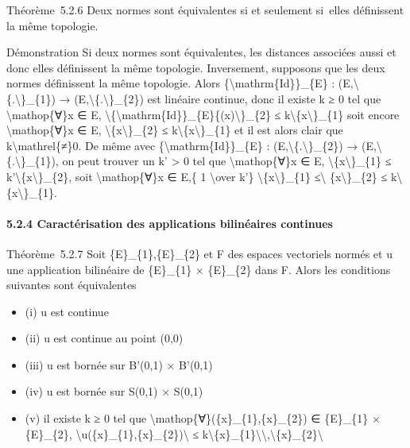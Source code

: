 \documentclass[]{article}
\begin{document}
Théorème~5.2.6 Deux normes sont équivalentes si et seulement si~elles
définissent la même topologie.

Démonstration Si deux normes sont équivalentes, les distances associées
aussi et donc elles définissent la même topologie. Inversement,
supposons que les deux normes définissent la même topologie. Alors
\{\textbackslash{}mathrm\{Id\}\}\_\{E\} :
(E,\textbackslash{}\textbar{}\{.\textbackslash{}\textbar{}\}\_\{1\}) →
(E,\textbackslash{}\textbar{}\{.\textbackslash{}\textbar{}\}\_\{2\}) est
linéaire continue, donc il existe k ≥ 0 tel que
\textbackslash{}mathop\{∀\}x ∈ E,
\textbackslash{}\textbar{}\{\textbackslash{}mathrm\{Id\}\}\_\{E\}\{(x)\textbackslash{}\textbar{}\}\_\{2\}
≤ k\textbackslash{}\textbar{}\{x\textbackslash{}\textbar{}\}\_\{1\} soit
encore \textbackslash{}mathop\{∀\}x ∈ E,
\textbackslash{}\textbar{}\{x\textbackslash{}\textbar{}\}\_\{2\} ≤
k\textbackslash{}\textbar{}\{x\textbackslash{}\textbar{}\}\_\{1\} et il
est alors clair que k\textbackslash{}mathrel\{≠\}0. De même avec
\{\textbackslash{}mathrm\{Id\}\}\_\{E\} :
(E,\textbackslash{}\textbar{}\{.\textbackslash{}\textbar{}\}\_\{2\}) →
(E,\textbackslash{}\textbar{}\{.\textbackslash{}\textbar{}\}\_\{1\}), on
peut trouver un k' \textgreater{} 0 tel que \textbackslash{}mathop\{∀\}x
∈ E, \textbackslash{}\textbar{}\{x\textbackslash{}\textbar{}\}\_\{1\} ≤
k'\textbackslash{}\textbar{}\{x\textbackslash{}\textbar{}\}\_\{2\}, soit
\textbackslash{}mathop\{∀\}x ∈ E,\{ 1 \textbackslash{}over k'\}
\textbackslash{}\textbar{}\{x\textbackslash{}\textbar{}\}\_\{1\}
≤\textbackslash{}\textbar{} \{x\textbackslash{}\textbar{}\}\_\{2\} ≤
k\textbackslash{}\textbar{}\{x\textbackslash{}\textbar{}\}\_\{1\}.

\paragraph{5.2.4 Caractérisation des applications bilinéaires continues}

Théorème~5.2.7 Soit \{E\}\_\{1\},\{E\}\_\{2\} et F des espaces
vectoriels normés et u une application bilinéaire de \{E\}\_\{1\} ×
\{E\}\_\{2\} dans F. Alors les conditions suivantes sont équivalentes

\begin{itemize}
\itemsep1pt\parskip0pt
\item
  (i) u est continue
\item
  (ii) u est continue au point (0,0)
\item
  (iii) u est bornée sur B'(0,1) × B'(0,1)
\item
  (iv) u est bornée sur S(0,1) × S(0,1)
\item
  (v) il existe k ≥ 0 tel que
  \textbackslash{}mathop\{∀\}(\{x\}\_\{1\},\{x\}\_\{2\}) ∈ \{E\}\_\{1\}
  × \{E\}\_\{2\},
  \textbackslash{}\textbar{}u(\{x\}\_\{1\},\{x\}\_\{2\})\textbackslash{}\textbar{}
  ≤
  k\textbackslash{}\textbar{}\{x\}\_\{1\}\textbackslash{}\textbar{}\textbackslash{},\textbackslash{}\textbar{}\{x\}\_\{2\}\textbackslash{}\textbar{}
\end{itemize}
\end{document}
